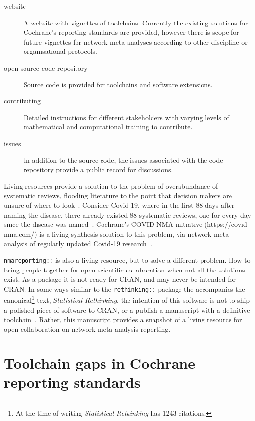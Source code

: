 \documentclass[12pt]{article}\usepackage[]{graphicx}\usepackage[]{color}
\newcommand{\package}[1]{\texttt{{#1::}}}
\begin{document}
\begin{description}
\item[website] A website with vignettes of toolchains. Currently the existing solutions for Cochrane's reporting standards are provided, however there is scope for future vignettes for network meta-analyses according to other discipline or organisational protocols.
\item[open source code repository] Source code is provided for toolchains and software extensions.
\item[contributing] Detailed instructions for different stakeholders with varying levels of mathematical and computational training to contribute.
\item[issues] In addition to the source code, the issues associated with the code repository provide a public record for discussions.
\end{description}

Living resources provide a solution to the problem of overabundance of systematic reviews, flooding literature to the point that decision makers are unsure of where to look~\cite{gopalakrishnan_systematic_2013, moher_problem_2013, moller_are_2018, richards_too_2018}. Consider Covid-19, where in the first 88 days after naming the disease, there already existed 88 systematic reviews, one for every day since the disease was named~\cite{naumann_too_2021}. Cochrane's COVID-NMA initiative (https://covid-nma.com/) is a living synthesis solution to this problem, via network meta-analysis of regularly updated Covid-19 research~\cite{boutron_covid-nma_2020}.

\package{nmareporting} is also a living resource, but to solve a different problem. How to bring people together for open scientific collaboration when not all the solutions exist. As a package it is not ready for CRAN, and may never be intended for CRAN. In some ways similar to the \package{rethinking} package the accompanies the canonical\footnote{
At the time of writing \emph{Statistical Rethinking} has 1243 citations.
} text, \emph{Statistical Rethinking}, the intention of this software is not to ship a polished piece of software to CRAN, or a publish a manuscript with a definitive toolchain~\cite{statrethinkingbook}. Rather, this manuscript provides a snapshot of a living resource for open collaboration on network meta-analysis reporting.

\section{Toolchain gaps in Cochrane reporting standards}
\end{document}
